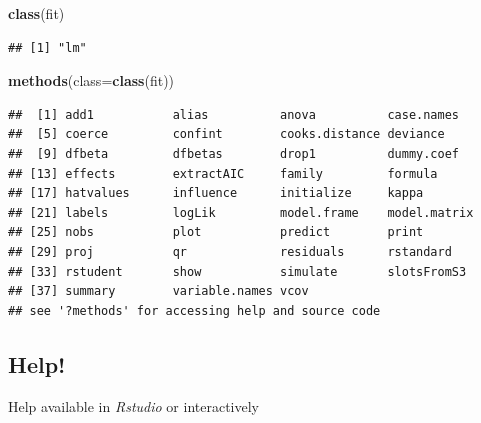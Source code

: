 \documentclass[]{article}
\newenvironment{Shaded}{\begin{snugshade}}{\end{snugshade}}
\newcommand{\KeywordTok}[1]{\textcolor[rgb]{0.13,0.29,0.53}{\textbf{#1}}}
\newcommand{\DataTypeTok}[1]{\textcolor[rgb]{0.13,0.29,0.53}{#1}}
\newcommand{\NormalTok}[1]{#1}
\theoremstyle{definition}
\theoremstyle{definition}
\theoremstyle{remark}
\begin{document}
\begin{itemize}
\begin{Shaded}
\begin{Highlighting}[]
\KeywordTok{class}\NormalTok{(fit)}
\end{Highlighting}
\end{Shaded}

\begin{verbatim}
## [1] "lm"
\end{verbatim}

\begin{Shaded}
\begin{Highlighting}[]
\KeywordTok{methods}\NormalTok{(}\DataTypeTok{class=}\KeywordTok{class}\NormalTok{(fit))}
\end{Highlighting}
\end{Shaded}

\begin{verbatim}
##  [1] add1           alias          anova          case.names    
##  [5] coerce         confint        cooks.distance deviance      
##  [9] dfbeta         dfbetas        drop1          dummy.coef    
## [13] effects        extractAIC     family         formula       
## [17] hatvalues      influence      initialize     kappa         
## [21] labels         logLik         model.frame    model.matrix  
## [25] nobs           plot           predict        print         
## [29] proj           qr             residuals      rstandard     
## [33] rstudent       show           simulate       slotsFromS3   
## [37] summary        variable.names vcov          
## see '?methods' for accessing help and source code
\end{verbatim}
\end{itemize}

\subsection{Help!}\label{help}

Help available in \emph{Rstudio} or interactively
\end{document}
